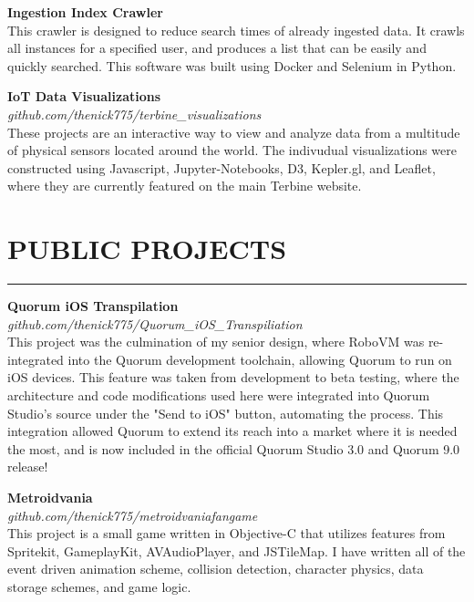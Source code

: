 \documentclass{res}
\begin{document}
\begin{resume}
		{\bf Ingestion Index Crawler} \hfill \vspace{5pt}\\
			This crawler is designed to reduce search times of already ingested data. It crawls all instances for a specified user, and produces a list that can be easily and quickly searched. This software was built using Docker and Selenium in Python.
\vspace{-5pt}

		{\bf IoT Data Visualizations} \\
    \emph{github.com/thenick775/terbine\_visualizations} \hfill \vspace{4pt}\\
			These projects are an interactive way to view and analyze data from a multitude of physical sensors located around the world. The indivudual visualizations were constructed using Javascript, Jupyter-Notebooks, D3, Kepler.gl, and Leaflet, where they are currently featured on the main Terbine website.

\vspace{-3pt}

		\section{{PUBLIC PROJECTS}}
    \noindent\rule[0.5ex]{\linewidth}{1pt}
		{\bf Quorum iOS Transpilation} \\
			\emph{github.com/thenick775/Quorum\_iOS\_Transpiliation} \hfill \vspace{2.5pt}\\
			This project was the culmination of my senior design, where RoboVM was re-integrated into the Quorum development toolchain, allowing Quorum to run on iOS devices. This feature was taken from development to beta testing, where the architecture and code modifications used here were integrated into Quorum Studio's source under the "Send to iOS" button, automating the process. This integration allowed Quorum to extend its reach into a market where it is needed the most, and is now included in the official Quorum Studio 3.0 and Quorum 9.0 release!
\vspace{-5pt}

		{\bf Metroidvania} \\
			\emph{github.com/thenick775/metroidvaniafangame} \hfill \vspace{3pt} \\
			This project is a small game written in Objective-C that utilizes features from Spritekit, GameplayKit, AVAudioPlayer, and JSTileMap. I have written all of the event driven animation scheme, collision detection, character physics, data storage schemes, and game logic.
\vspace{-4pt}


\end{resume}
\end{document}
